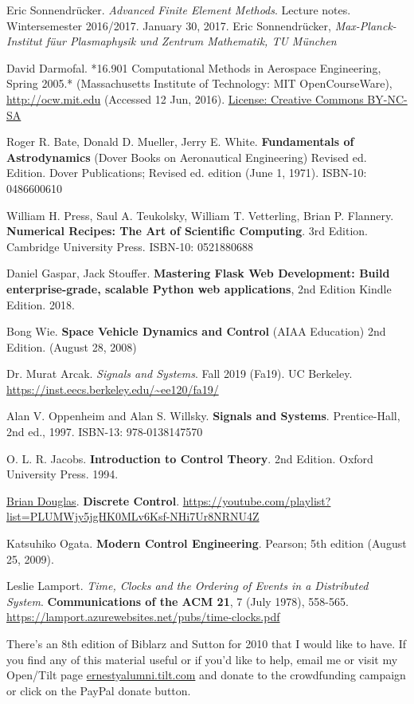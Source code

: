 \documentclass[10pt]{amsart}
\begin{document}
\begin{thebibliography}{9}
Eric Sonnendr\"{u}cker.  \emph{Advanced Finite Element Methods}.  Lecture notes.  Wintersemester 2016/2017.  January 30, 2017.  Eric Sonnendr\"{u}cker, \emph{Max-Planck-Institut f\"{u}ur Plasmaphysik und Zentrum Mathematik, TU M\"{u}nchen}

  David Darmofal. *16.901 Computational Methods in Aerospace Engineering, Spring 2005.* (Massachusetts Institute of Technology: MIT OpenCourseWare), \url{http://ocw.mit.edu} (Accessed 12 Jun, 2016). \href{http://creativecommons.org/licenses/by-nc-sa/4.0/}{License: Creative Commons BY-NC-SA}

Roger R. Bate, Donald D. Mueller, Jerry E. White. \textbf{Fundamentals of Astrodynamics} (Dover Books on Aeronautical Engineering) Revised ed. Edition. Dover Publications; Revised ed. edition (June 1, 1971). ISBN-10: 0486600610

William H. Press, Saul A. Teukolsky, William T. Vetterling, Brian P. Flannery. \textbf{Numerical Recipes: The Art of Scientific Computing}. 3rd Edition.  Cambridge University Press.  ISBN-10: 0521880688

Daniel Gaspar, Jack Stouffer.
\textbf{Mastering Flask Web Development: Build enterprise-grade, scalable Python web applications}, 2nd Edition Kindle Edition. 2018.

Bong Wie. \textbf{Space Vehicle Dynamics and Control} (AIAA Education) 2nd Edition. (August 28, 2008)

Dr. Murat Arcak. \emph{Signals and Systems}. Fall 2019 (Fa19). UC Berkeley. \url{https://inst.eecs.berkeley.edu/~ee120/fa19/}

Alan V. Oppenheim and Alan S. Willsky. \textbf{Signals and Systems}. Prentice-Hall, 2nd ed., 1997.  ISBN-13: 978-0138147570 

O. L. R. Jacobs. \textbf{Introduction to Control Theory}. 2nd Edition. Oxford University Press. 1994.

\href{https://www.youtube.com/channel/UCq0imsn84ShAe9PBOFnoIrg}{Brian Douglas}. \textbf{Discrete Control}. \url{https://youtube.com/playlist?list=PLUMWjy5jgHK0MLv6Ksf-NHi7Ur8NRNU4Z}

Katsuhiko Ogata. \textbf{Modern Control Engineering}. Pearson; 5th edition (August 25, 2009).

Leslie Lamport. \emph{Time, Clocks and the Ordering of Events in a Distributed System}. \textbf{Communications of the ACM 21}, 7   (July 1978), 558-565. \url{https://lamport.azurewebsites.net/pubs/time-clocks.pdf} 


  
\end{thebibliography}
There's an 8th edition of Biblarz and Sutton \cite{GSuttonOBiblarz2001} for 2010 that I would like to have.  If you find any of this material useful or if you'd like to help, email me or visit my Open/Tilt page \url{ernestyalumni.tilt.com} and donate to the crowdfunding campaign or click on the PayPal donate button.  
\end{document}

